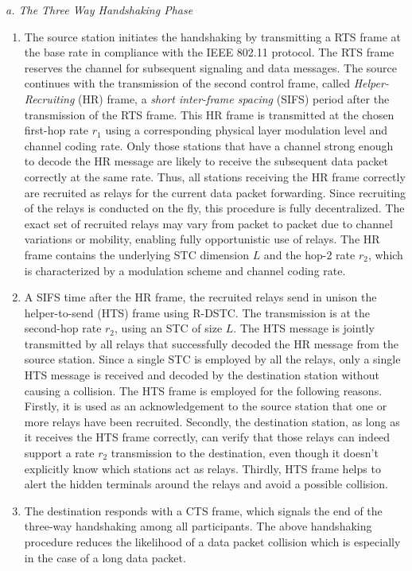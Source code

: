 \documentclass[peerreview,draftcls,onecolumn,12pt,a4paper]{IEEEtran}
\begin{document}
 {\em a. The Three Way Handshaking Phase}

\begin{enumerate}
\item The source station  initiates the handshaking by
transmitting a RTS frame at the base rate in compliance with the
IEEE 802.11 protocol. The RTS frame reserves the channel for
subsequent signaling and data messages. The source continues with
the transmission of the second control frame, called
\emph{Helper-Recruiting} (HR) frame, a \emph{short inter-frame
spacing} (SIFS) period after the transmission of the RTS frame.
This HR frame is transmitted at the chosen first-hop rate $r_{1}$
using a corresponding physical layer modulation level and channel
coding rate. Only those stations that have a channel strong enough
to decode the HR message are likely to receive the subsequent data
packet correctly at the same rate. Thus, all stations receiving
the HR frame correctly are recruited as relays for the current
data packet forwarding. Since recruiting of the relays is
conducted on the fly, this procedure is fully decentralized. The
exact set of recruited relays may vary from packet to packet due
to channel variations or mobility, enabling fully opportunistic
use of relays. The HR frame contains the underlying STC dimension
$L$ and the hop-2 rate $r_{2}$, which is characterized by a
modulation scheme and channel coding rate.

\item A SIFS time after the HR  frame, the recruited relays send
in unison the helper-to-send (HTS) frame using R-DSTC. The
transmission is at the second-hop rate $r_{2}$, using an STC of
size $L$. The HTS message is jointly transmitted by all relays
that successfully decoded the HR message from the source station.
Since a single STC is employed by all the relays, only a
single HTS message is received and decoded by the destination
station without causing a collision. The HTS frame is employed for
the following reasons. Firstly, it is used as an acknowledgement
to the source station that one or more relays have been recruited.
Secondly, the destination station, as long as it receives the HTS
frame correctly, can verify that those relays can indeed support a
rate $r_{2}$ transmission to the destination, even though it doesn't explicitly know which stations act as relays. Thirdly, HTS frame
helps
to alert the hidden terminals around the relays and avoid a possible collision. 

\item The destination responds with a CTS frame, which signals the
end of the three-way handshaking among all participants. The above
handshaking procedure reduces the likelihood of a data packet
collision which is especially in the case of a long data packet.
\end{enumerate}
\end{document}
